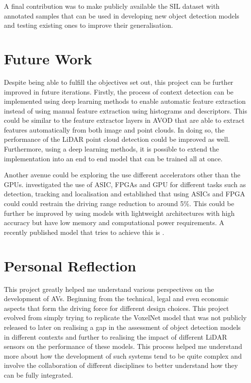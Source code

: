 A final contribution was to make publicly available the SIL dataset with annotated samples that can be used in developing new object detection models and testing existing ones to improve their generalisation. 

\section{Future Work}
Despite being able to fulfill the objectives set out, this project can be further improved in future iterations. 
Firstly, the process of context detection can be implemented using deep learning methods to enable automatic feature extraction instead of using manual feature extraction using histograms and descriptors. This could be similar to the feature extractor layers in AVOD that are able to extract features automatically from both image and point clouds. In doing so, the performance of the LiDAR point cloud detection could be improved as well. Furthermore, using a deep learning methods, it is possible to extend the implementation into an end to end model that can be trained all at once. 

Another avenue could be exploring the use different accelerators other than the GPUs. \cite{lin2018architectural} investigated the use of ASIC, FPGAs and GPU for different tasks such as detection, tracking and localisation and established that using ASICs and FPGA could could restrain the driving range reduction to around 5\%. This could be further be improved by using models with lightweight architectures with high accuracy but have low memory and computational power requirements. A recently published model that tries to achieve this is \cite{wang2018pointseg}. 

\section{Personal Reflection}

This project greatly helped me understand various perspectives on the development of AVs. Beginning from the technical, legal and even economic aspects that form the driving force for different design choices. This project evolved from simply trying to replicate the VoxelNet model that was not publicly released to later on realising a gap in the assessment of object detection models in different contexts and further to realising the impact of different LiDAR sensors on the performance of these models. This process helped me understand more about how the development of such systems tend to be quite complex and involve the collaboration of different disciplines to better understand how they can be fully integrated.

